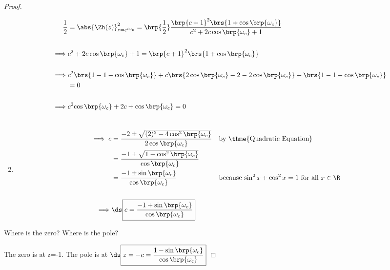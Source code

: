 \begin{proof}
\begin{enumerate}
\begin{align*}
  \frac{1}{2}
    &= \abs{\Zh(z)}^2_{z=e^{i\omega_c}}
     = \brp{\frac{1}{2}}
       \frac{\brp{c+1}^2\brs{1 +  \cos\brp{\omega_c}}}
            {c^2 + 2 c\cos\brp{\omega_c} + 1} 
  \\\\\implies &c^2 + 2 c\cos\brp{\omega_c} + 1 
             = \brp{c+1}^2\brs{1 +  \cos\brp{\omega_c}}
  \\\\\implies & c^2\brs{1-1-\cos\brp{\omega_c}} 
             + c  \brs{2\cos\brp{\omega_c}-2-2\cos\brp{\omega_c}}
             +    \brs{1-1-\cos\brp{\omega_c}}
             \\&= 0
  \\\\\implies & c^2{\cos\brp{\omega_c}} 
             + 2c
             +    {\cos\brp{\omega_c}}
             = 0
\end{align*}

\item 

  \begin{align*}
    \\\implies c &= \frac{-2 \pm \sqrt{(2)^2 -4\cos^2\brp{\omega_c}}}
                         {2\cos\brp{\omega_c}}
                 && \text{by \thme{Quadratic Equation}}
               \\&= \frac{-1 \pm \sqrt{1 -\cos^2\brp{\omega_c}}}
                         {\cos\brp{\omega_c}}
               \\&= \frac{-1 \pm \sin\brp{\omega_c}}
                         {\cos\brp{\omega_c}}
                 && \text{because $\sin^2x + \cos^2x = 1$ for all $x\in\R$}
    \\
    \\\implies &\ds\boxed{c = \frac{-1 + \sin\brp{\omega_c}}
                      {\cos\brp{\omega_c}}}
  \end{align*}
\end{enumerate}

Where is the zero? Where is the pole?

The zero is at z=-1. \qquad The pole is at 
$\ds\boxed{z=-c = \frac{1 - \sin\brp{\omega_c}}
                    {\cos\brp{\omega_c}}}$

\end{proof}

